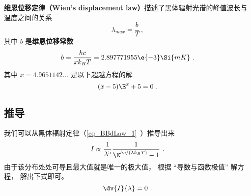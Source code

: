 

\textbf{维恩位移定律（Wien's displacement law）}描述了黑体辐射光谱的峰值波长与温度之间的关系
\begin{equation}
\lambda_{max} = \frac{b}{T}~,
\end{equation}
其中 $b$ 是\textbf{维恩位移常数}
\begin{equation}
b = \frac{hc}{xk_B T} = 2.897771955\e{-3} \Si{mK}~.
\end{equation}
其中 $x = 4.9651142\dots$ 是以下超越方程的解
\begin{equation}
(x-5)\E^x + 5 = 0~.
\end{equation}

\subsection{推导}

我们可以从黑体辐射定律（\autoref{eq_BBdLaw_1}~）推导出来
\begin{equation}
I \propto \frac{1}{\lambda^5} \frac{1}{\E^{hc/(\lambda k_B T)} - 1}~.
\end{equation}
由于该分布处处可导且最大值就是唯一的极大值， 根据 “导数与函数极值” 解方程， 解出下式即可。
\begin{equation}
\dv{I}{\lambda} = 0~.
\end{equation}
